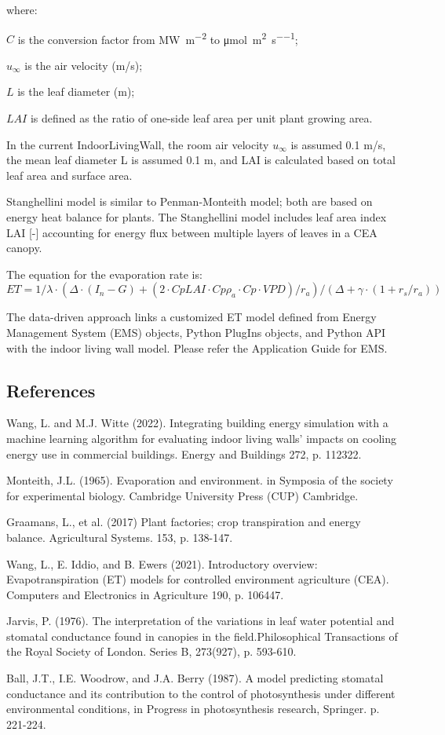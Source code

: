 where:

\(C\) is the conversion factor from \unit{\mega\watt\per\square\meter} to \unit{\micro\mole\per\square\meter\per\second};

\(u_\infty\) is the air velocity (m/s);

\(L\) is the leaf diameter (m);

\(LAI\) is defined as the ratio of one-side leaf area per unit plant growing area. 

In the current IndoorLivingWall, the room air velocity \(u_\infty\) is assumed 0.1 m/s, the mean leaf diameter L is assumed 0.1 m, and LAI is calculated based on total leaf area and surface area. 

Stanghellini model is similar to Penman-Monteith model; both are based on energy heat balance for plants. The Stanghellini model includes leaf area index LAI [-] accounting for energy flux between multiple layers of leaves in a CEA canopy. 

The equation for the evaporation rate is:
\begin{equation}
ET=1/\lambda \cdot (\Delta \cdot(I_n-G)+(2 \cdot Cp LAI \cdot Cp \rho_a \cdot Cp \cdot VPD)/r_a )/(\Delta+\gamma \cdot (1+r_s/r_a ) )
\end{equation}

The data-driven approach links a customized ET model defined from Energy Management System (EMS) objects, Python PlugIns objects, and Python API with the indoor living wall model. Please refer the Application Guide for EMS. 

\subsection{References}\label{references-indoorlivingwall}

Wang, L. and M.J. Witte (2022). Integrating building energy simulation with a machine learning algorithm for evaluating indoor living walls’ impacts on cooling energy use in commercial buildings. Energy and Buildings 272, p. 112322.

  Monteith, J.L. (1965). Evaporation and environment. in Symposia of the society for experimental biology. Cambridge University Press (CUP) Cambridge.
  
  Graamans, L., et al. (2017) Plant factories; crop transpiration and energy balance. Agricultural Systems. 153, p. 138-147.
  
  Wang, L., E. Iddio, and B. Ewers (2021). Introductory overview: Evapotranspiration (ET) models for controlled environment agriculture (CEA). Computers and Electronics in Agriculture 190, p. 106447.
  
  Jarvis, P. (1976). The interpretation of the variations in leaf water potential and stomatal conductance found in canopies in the field.Philosophical Transactions of the Royal Society of London. Series B, 273(927), p. 593-610.
  
  Ball, J.T., I.E. Woodrow, and J.A. Berry (1987). A model predicting stomatal conductance and its contribution to the control of photosynthesis under different environmental conditions, in Progress in photosynthesis research, Springer. p. 221-224.

